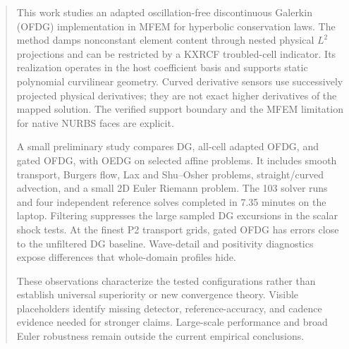 \begin{abstract}
This work studies an adapted oscillation-free discontinuous Galerkin (OFDG)
implementation in MFEM for hyperbolic conservation laws. The method damps
nonconstant element content through nested physical $L^2$ projections and can
be restricted by a KXRCF troubled-cell indicator. Its realization operates in
the host coefficient basis and supports static polynomial curvilinear geometry.
Curved derivative sensors use successively projected physical derivatives;
they are not exact higher derivatives of the mapped solution. The verified
support boundary and the MFEM limitation for native NURBS faces are explicit.

A small preliminary study compares DG, all-cell adapted OFDG, and gated OFDG,
with OEDG on selected affine problems. It includes smooth transport, Burgers
flow, Lax and Shu--Osher problems, straight/curved advection, and a small
2D Euler Riemann problem. The 103 solver runs and four independent reference
solves completed in 7.35 minutes on the laptop. Filtering suppresses the large
sampled DG excursions in the scalar shock tests. At the finest P2 transport
grids, gated OFDG has errors close to the unfiltered DG baseline. Wave-detail
and positivity diagnostics expose differences that whole-domain profiles hide.

These observations characterize the tested configurations rather than establish
universal superiority or new convergence theory. Visible placeholders identify
missing detector, reference-accuracy, and cadence evidence needed for stronger
claims. Large-scale performance and broad Euler robustness remain outside the
current empirical conclusions.
\end{abstract}
